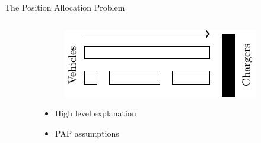 \documentclass[bigger]{beamer}
\begin{document}
\begin{frame}[label={sec:org810cc46}]{The Position Allocation Problem}
\begin{columns}
\begin{column}{0.5\columnwidth}
\end{column}
\begin{column}{0.5\columnwidth}
\begin{figure}[htpb]
\centering
    \includegraphics{img/pap}
    \label{subfig:papexample}
\end{figure}
\begin{itemize}
\item High level explanation
\item PAP assumptions
\end{itemize}
\end{column}
\end{columns}
\end{frame}
\end{document}
